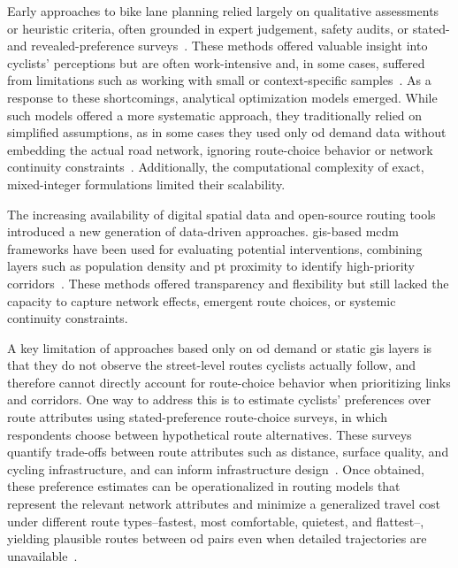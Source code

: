     Early approaches to bike lane planning relied largely on qualitative assessments or heuristic criteria, often grounded in expert judgement, safety audits, or stated- and revealed-preference surveys~\cite{Dondi2011, Tilahun2007, Sener2009}. These methods offered valuable insight into cyclists' perceptions but are often work-intensive and, in some cases, suffered from limitations such as working with small or context-specific samples~\cite{Tilahun2007}. As a response to these shortcomings, analytical optimization models emerged. While such models offered a more systematic approach, they traditionally relied on simplified assumptions, as in some cases they used only \ac{od} demand data without embedding the actual road network, ignoring route-choice behavior or network continuity constraints~\cite{Lin2011}. Additionally, the computational complexity of exact, mixed-integer formulations limited their scalability. 

    The increasing availability of digital spatial data and open-source routing tools introduced a new generation of data-driven approaches. \ac{gis}-based \ac{mcdm} frameworks have been used for evaluating potential interventions, combining layers such as population density and \ac{pt} proximity to identify high-priority corridors~\cite{Rybarczyk2010, Guler2021a}. These methods offered transparency and flexibility but still lacked the capacity to capture network effects, emergent route choices, or systemic continuity constraints.

    A key limitation of approaches based only on \ac{od} demand or static \ac{gis} layers is that they do not observe the street-level routes cyclists actually follow, and therefore cannot directly account for route-choice behavior when prioritizing links and corridors. One way to address this is to estimate cyclists' preferences over route attributes using stated-preference route-choice surveys, in which respondents choose between hypothetical route alternatives. These surveys quantify trade-offs between route attributes such as distance, surface quality, and cycling infrastructure, and can inform infrastructure design~\cite{Reckermann2024, Stinson2003}. Once obtained, these preference estimates can be operationalized in routing models that represent the relevant network attributes and minimize a generalized travel cost under different route types--fastest, most comfortable, quietest, and flattest--, yielding plausible routes between \ac{od} pairs even when detailed trajectories are unavailable~\cite{Hrncir2014}.

